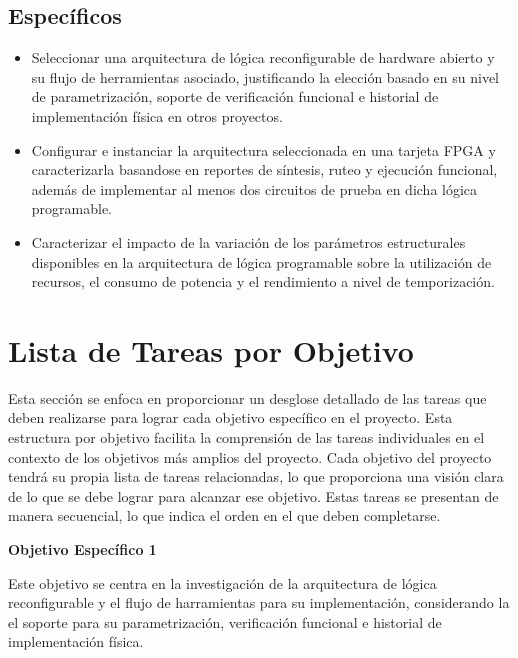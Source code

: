 \subsection{Específicos}
	\begin{itemize}
                \item Seleccionar una arquitectura de lógica reconfigurable de hardware 
                abierto y su flujo de herramientas asociado, justificando la elección 
                basado en su nivel de parametrización, soporte de verificación funcional 
                e historial de implementación física en otros proyectos.

                \item Configurar e instanciar la arquitectura seleccionada en una tarjeta 
                FPGA y caracterizarla basandose en reportes de síntesis, ruteo y ejecución 
                funcional, además de implementar al menos dos circuitos de prueba en dicha 
                lógica programable.
                             
                \item Caracterizar el impacto de la variación de los parámetros 
                estructurales disponibles en la arquitectura de lógica programable sobre 
                la utilización de recursos, el consumo de potencia y el rendimiento a nivel 
                de temporización.
    \end{itemize}
 
\section{Lista de Tareas por Objetivo}

Esta sección se enfoca en proporcionar un desglose detallado de las tareas que 
deben realizarse para lograr cada objetivo específico en el proyecto. Esta 
estructura por objetivo facilita la comprensión de las tareas individuales en el 
contexto de los objetivos más amplios del proyecto. Cada objetivo del proyecto 
tendrá su propia lista de tareas relacionadas, lo que proporciona una visión clara 
de lo que se debe lograr para alcanzar ese objetivo. Estas tareas se presentan de 
manera secuencial, lo que indica el orden en el que deben completarse.

\textbf{\normalsize{Objetivo Específico 1}}

Este objetivo se centra en la investigación de la arquitectura de 
lógica reconfigurable y el flujo de harramientas para su implementación, 
considerando la el soporte para su parametrización, verificación 
funcional e historial de implementación física.

